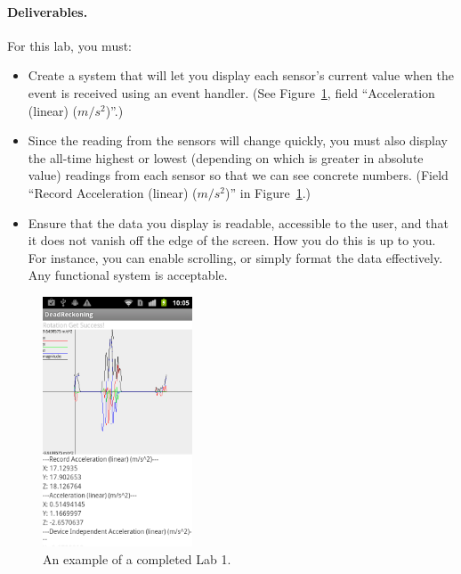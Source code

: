 \documentclass[10pt]{article}
\newcommand{\todo}[1]{{\red\textbf{TODO: }#1}\xspace}
\begin{document}
\paragraph{Deliverables.} For this lab, you must:
\begin{itemize}
\item Create a system that will let you display each sensor's current value when the event is received using an event handler. (See Figure~\ref{fig:device-screenshot}, field ``Acceleration (linear) ($m/s^2$)''.)
\item Since the reading from the sensors will change quickly, you must also display the all-time highest or lowest (depending on which is greater in absolute value) readings from each sensor so that we can see concrete numbers.  (Field ``Record Acceleration (linear) ($m/s^2$)'' in Figure~\ref{fig:device-screenshot}.)
\item Ensure that the data you display is readable, accessible to the user, and that it does not vanish off the edge of the screen. How you do this is up to you. For instance, you can enable scrolling, or simply format the data effectively. Any functional system is acceptable.
\end{itemize}



\begin{figure}[htbp]
\begin{center}
\includegraphics[height=20em]{device-screenshot.png}
\end{center}
\caption{\label{fig:device-screenshot}An example of a completed Lab 1.}
\end{figure}
\end{document}
